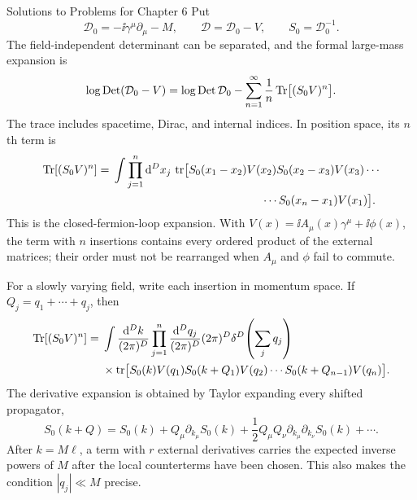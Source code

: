 \begin{bankssolutions}{Solutions to Problems for Chapter 6}
Put
\[
 \mathcal D_0=-\ii\gamma^\mu\partial_\mu-M,
 \qquad
 \mathcal D=\mathcal D_0-V,
 \qquad
 S_0=\mathcal D_0^{-1}.
\]
The field-independent determinant can be separated, and the formal
large-mass expansion is
\begin{equation*}
 \log\operatorname{Det}(\mathcal D_0-V)
 =\log\operatorname{Det}\mathcal D_0
 -\sum_{n=1}^{\infty}\frac1n\operatorname{Tr}\bigl[(S_0V)^n\bigr].
\end{equation*}
The trace includes spacetime, Dirac, and internal indices.  In position
space, its $n$th term is
\begin{align*}
 \Tr[(S_0V)^n]
 ={}&\int\prod_{j=1}^{n}\dd^D x_j\,
 \operatorname{tr}\bigl[S_0(x_1-x_2)V(x_2)S_0(x_2-x_3)V(x_3)\cdots\\
 &\hspace{4.6cm}\cdots S_0(x_n-x_1)V(x_1)\bigr].
\end{align*}
This is the closed-fermion-loop expansion.  With
$V(x)=\ii A_\mu(x)\gamma^\mu+\ii\phi(x)$, the term with $n$ insertions
contains every ordered product of the external matrices; their order must
not be rearranged when $A_\mu$ and $\phi$ fail to commute.

For a slowly varying field, write each insertion in momentum space.  If
$Q_j=q_1+\cdots+q_j$, then
\begin{align*}
 \operatorname{Tr}[(S_0V)^n]
 ={}&\int\frac{\mathop{}\!\mathrm{d}^D k}{(2\pi)^D}
 \prod_{j=1}^{n}\frac{\mathop{}\!\mathrm{d}^D q_j}{(2\pi)^D}
 (2\pi)^D\delta^D\!\left(\sum_jq_j\right)\\
 &\times\operatorname{tr}\bigl[S_0(k)V(q_1)S_0(k+Q_1)V(q_2)\cdots
 S_0(k+Q_{n-1})V(q_n)\bigr].
\end{align*}
The derivative expansion is obtained by Taylor expanding every shifted
propagator,
\[
 S_0(k+Q)=S_0(k)+Q_\mu\partial_{k_\mu}S_0(k)
 +\frac12Q_\mu Q_\nu\partial_{k_\mu}\partial_{k_\nu}S_0(k)+\cdots.
\]
After $k=M\ell$, a term with $r$ external derivatives carries the expected
inverse powers of $M$ after the local counterterms have been chosen.  This
also makes the condition $|q_j|\ll M$ precise.


\end{bankssolutions}
